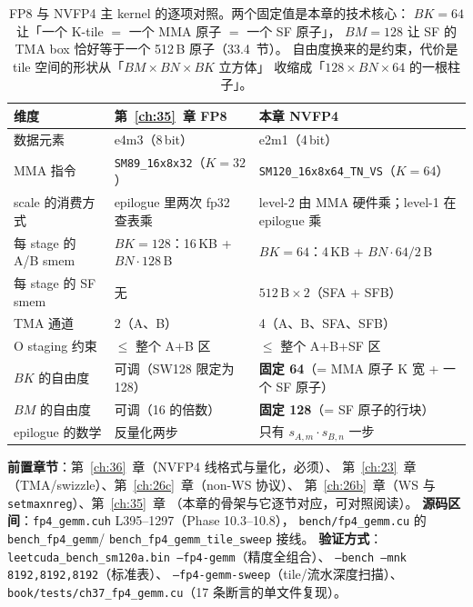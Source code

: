 \begin{table}[H]
\centering
\footnotesize
\begin{tabular}{lll}
\toprule
维度 & 第~\ref{ch:35}~章 FP8 & 本章 NVFP4 \\
\midrule
数据元素 & e4m3（8\,bit） & e2m1（4\,bit） \\
MMA 指令 & \texttt{SM89\_16x8x32}（$K{=}32$） & \texttt{SM120\_16x8x64\_TN\_VS}（$K{=}64$） \\
scale 的消费方式 & epilogue 里两次 fp32 查表乘 & level-2 由 MMA 硬件乘；level-1 在 epilogue 乘 \\
每 stage 的 A/B smem & $BK{=}128$：16\,KB + $BN{\cdot}128$\,B & $BK{=}64$：4\,KB + $BN{\cdot}64/2$\,B \\
每 stage 的 SF smem & 无 & $512\,\mathrm{B}\times 2$（SFA + SFB） \\
TMA 通道 & 2（A、B） & 4（A、B、SFA、SFB） \\
O staging 约束 & $\le$ 整个 A+B 区 & $\le$ 整个 A+B+SF 区 \\
$BK$ 的自由度 & 可调（SW128 限定为 128） & \textbf{固定 64}（= MMA 原子 K 宽 + 一个 SF 原子） \\
$BM$ 的自由度 & 可调（16 的倍数） & \textbf{固定 128}（= SF 原子的行块） \\
epilogue 的数学 & 反量化两步 & 只有 $s_{A,m}\cdot s_{B,n}$ 一步 \\
\bottomrule
\end{tabular}
\caption{FP8 与 NVFP4 主 kernel 的逐项对照。两个固定值是本章的技术核心：
$BK{=}64$ 让「一个 K-tile $=$ 一个 MMA 原子 $=$ 一个 SF 原子」，
$BM{=}128$ 让 SF 的 TMA box 恰好等于一个 512\,B 原子（33.4~节）。
自由度换来的是约束，代价是 tile 空间的形状从「$BM\times BN\times BK$ 立方体」
收缩成「$128\times BN\times 64$ 的一根柱子」。}
\label{tab:37-fp8-vs-fp4}
\end{table}

\textbf{前置章节}：第~\ref{ch:36}~章（NVFP4 线格式与量化，必须）、
第~\ref{ch:23}~章（TMA/swizzle）、第~\ref{ch:26c}~章（non-WS 协议）、
第~\ref{ch:26b}~章（WS 与 \texttt{setmaxnreg}）、第~\ref{ch:35}~章
（本章的骨架与它逐节对应，可对照阅读）。
\textbf{源码区间}：\texttt{fp4\_gemm.cuh} L395--1297（Phase 10.3--10.8），
\texttt{bench/fp4\_gemm.cu} 的 \texttt{bench\_fp4\_gemm}/
\texttt{bench\_fp4\_gemm\_tile\_sweep} 接线。
\textbf{验证方式}：\texttt{leetcuda\_bench\_sm120a.bin --fp4-gemm}（精度全组合）、
\texttt{--bench --mnk 8192,8192,8192}（标准表）、
\texttt{--fp4-gemm-sweep}（tile/流水深度扫描）、
\texttt{book/\allowbreak tests/\allowbreak ch37\_fp4\_gemm.cu}（17 条断言的单文件复现）。

